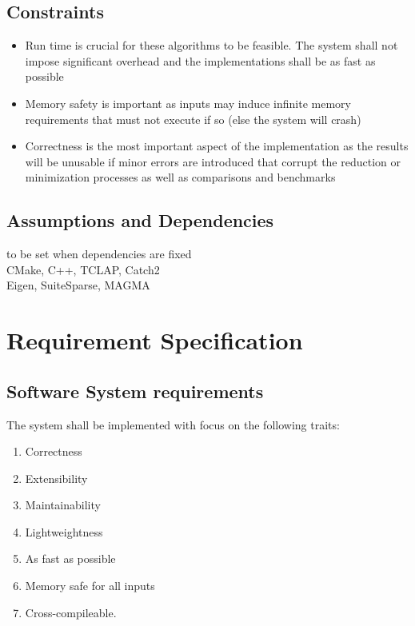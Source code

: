         \subsection{Constraints}
            \begin{itemize}
                \item Run time is crucial for these algorithms to be feasible. The system shall not impose significant overhead and the implementations shall be as fast as possible
                \item Memory safety is important as inputs may induce infinite memory requirements that must not execute if so (else the system will crash)
                \item Correctness is the most important aspect of the implementation as the results will be unusable if minor errors are introduced that corrupt the reduction or minimization processes as well as comparisons and benchmarks
            \end{itemize}

        \subsection{Assumptions and Dependencies}
            to be set when dependencies are fixed \\
            CMake, C++, TCLAP, Catch2 \\
            Eigen, SuiteSparse, MAGMA
    \newpage       
    
    
    \section{Requirement Specification}
        \subsection{Software System requirements}
            The system shall be implemented with focus on the following traits:
            \begin{enumerate}[S 1.]
                    \item Correctness
                    \item Extensibility
                    \item Maintainability
                    \item Lightweightness
                    \item As fast as possible
                    \item Memory safe for all inputs
                    \item Cross-compileable.
            \end{enumerate}  
    
